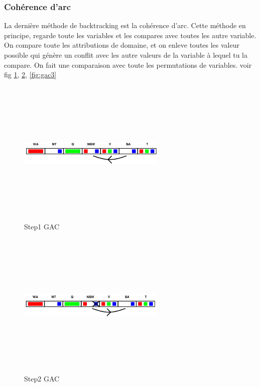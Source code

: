 \documentclass[oneside]{book}
\begin{document}
\subsubsection{Cohérence d'arc}
La dernière méthode de backtracking est la cohérence d'arc. Cette méthode en principe, regarde toute les variables et les compares avec toutes les autre variable. On compare toute les attributions de domaine, et on enleve toutes les valeur possible qui génère un conflit avec les autre valeurs de la variable à lequel tu la compare. On fait une comparaison avec toute les permutations de variables. voir fig \ref{fig:gac1}, \ref{fig:gac2}, \ref{fig:gac3} \\

\begin{figure}[!ht]
\centering
\includegraphics[width = 7cm, height = 7cm, keepaspectratio]{gac1.png}
\caption{Step1 GAC}
\label{fig:gac1}
\end{figure} 

\begin{figure}[!ht]
\centering
\includegraphics[width = 7cm, height = 7cm, keepaspectratio]{gac2.png}
\caption{Step2 GAC}
\label{fig:gac2}
\end{figure}
\end{document}
